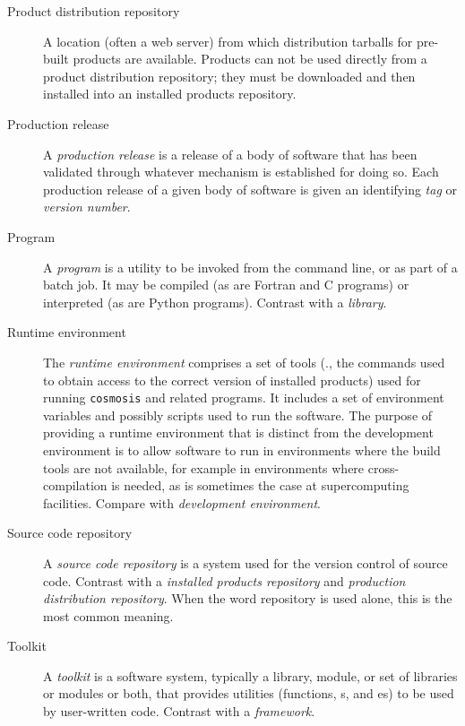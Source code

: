 \documentclass{memarticle}
\newcommand{\prog}[1]%
  {\texttt{#1}}
\begin{document}
\begin{description}
\item[Product distribution repository] A location (often a web server)
  from which distribution tarballs for pre-built products are available.
  Products can not be used directly from a product distribution
  repository; they must be downloaded and then installed into an
  installed products repository.

\item[Production release] A \emph{production release} is a release of a
  body of software that has been validated through whatever mechanism is
  established for doing so. Each production release of a given body of
  software is given an identifying \emph{tag} or \emph{version number}.

\item[Program] A \emph{program} is a utility to be invoked from the
  command line, or as part of a batch job. It may be compiled (as are
  Fortran and C programs) or interpreted (as are Python programs).
  Contrast with a \emph{library}.

\item[Runtime environment] The \emph{runtime environment} comprises a
  set of tools (\eg., the commands used to obtain access to the correct
  version of installed products) used for running \prog{cosmosis} and
  related programs. It includes a set of environment variables and
  possibly scripts used to run the software. The purpose of providing a
  runtime environment that is distinct from the development environment
  is to allow software to run in environments where the build tools are
  not available, for example in environments where cross-compilation is
  needed, as is sometimes the case at supercomputing facilities. Compare
  with \emph{development environment}.

\item[Source code repository] A \emph{source code repository} is a
  system used for the version control of source code. Contrast with a
  \emph{installed products repository} and \emph{production distribution
    repository}. When the word repository is used alone, this is the
  most common meaning.

\item[Toolkit] A \emph{toolkit} is a software system, typically a
  library, module, or set of libraries or modules or both, that provides
  utilities (functions, s, and es) to be used
  by user-written code. Contrast with a \emph{framework}.

\end{description}
\end{document}

